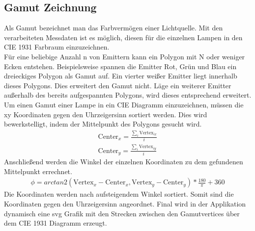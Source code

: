 \documentclass[11pt]{scrartcl}
\begin{document}
\subsection{Gamut Zeichnung}
Als Gamut bezeichnet man das Farbvermögen einer Lichtquelle. Mit den verarbeiteten Messdaten ist es möglich, diesen für die einzelnen Lampen in den CIE
1931 Farbraum einzuzeichnen.\\
Für eine beliebige Anzahl n von Emittern kann ein Polygon mit N oder weniger Ecken entstehen. Beispielsweise spannen die Emitter Rot, Grün und Blau ein
dreieckiges Polygon als Gamut auf. Ein vierter weißer Emitter liegt innerhalb dieses Polygons. Dies erweitert den Gamut nicht. Läge ein weiterer Emitter
außerhalb des bereits aufgespannten Polygons, wird dieses entsprechend erweitert.\\
Um einen Gamut einer Lampe in ein CIE Diagramm einzuzeichnen, müssen die xy Koordinaten gegen den Uhrzeigersinn sortiert werden. Dies wird bewerkstelligt,
indem der Mittelpunkt des Polygons gesucht wird.
\begin{align}\label{Equ:14}
    \text{Center}_x = \frac{\sum_{i}\text{Vertex}_{ix}}{i}\\
    \text{Center}_y = \frac{\sum_{i}\text{Vertex}_{iy}}{i}
\end{align}
Anschließend werden die Winkel der einzelnen Koordinaten zu dem gefundenen Mittelpunkt errechnet.
\begin{align}\label{Equ:15}
    \phi = arctan2(\text{Vertex}_x - \text{Center}_x, \text{Vertex}_y - \text{Center}_y)*\frac{180}{\pi}+360 %
\end{align}
Die Koordinaten werden nach aufsteigendem Winkel sortiert. Somit sind die Koordinaten gegen den Uhrzeigersinn angeordnet. Final wird in der Applikation
dynamisch eine \ac{svg} Grafik mit den Strecken zwischen den Gamutvertices über dem CIE 1931 Diagramm erzeugt.\\
\end{document}
